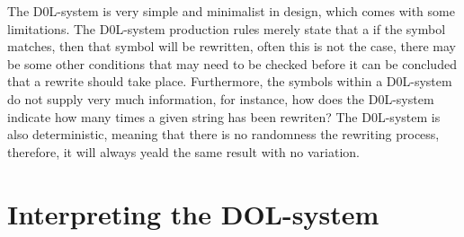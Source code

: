 \begin{flushleft}
\vspace{5mm}

The D0L-system is very simple and minimalist in design, which comes with some limitations. The D0L-system production rules merely state that a if the symbol matches, then that symbol will be rewritten, often this is not the case, there may be some other conditions that may need to be checked before it can be concluded that a rewrite should take place. Furthermore, the symbols within a D0L-system do not supply very much information, for instance, how does the D0L-system indicate how many times a given string has been rewriten? The D0L-system is also deterministic, meaning that there is no randomness the rewriting process, therefore, it will always yeald the same result with no variation. \\

\vspace{5mm}

\end{flushleft}

\section{Interpreting the DOL-system} \label{Interpreting DOL-system}

